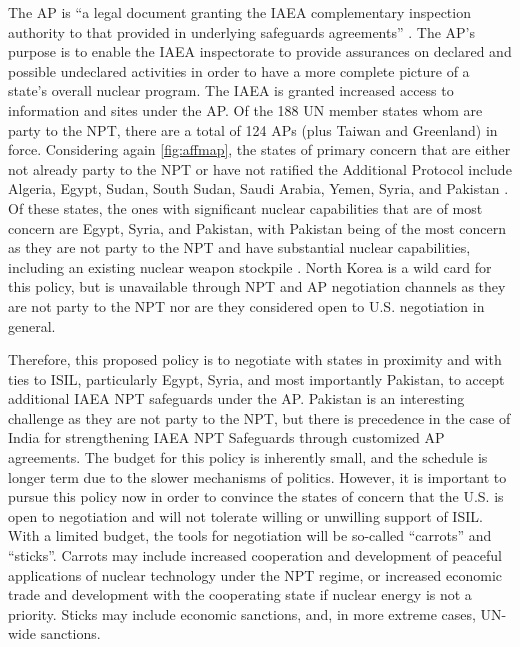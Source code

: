 \documentclass{report}
\begin{document}
The AP is \enquote{a legal document granting the IAEA complementary inspection authority to that provided in underlying safeguards agreements} \cite{InternationalAtomicEnergyAgency1997}. The AP's purpose is to enable the IAEA inspectorate to provide assurances on declared and possible undeclared activities in order to have a more complete picture of a state's overall nuclear program. The IAEA is granted increased access to information and sites under the AP. Of the 188 UN member states whom are party to the NPT, there are a total of 124 APs (plus Taiwan and Greenland) in force. Considering again \autoref{fig:affmap}, the states of primary concern that are either not already party to the NPT or have not ratified the Additional Protocol include Algeria, Egypt, Sudan, South Sudan, Saudi Arabia, Yemen, Syria, and Pakistan \cite{DefenseThreatReductionAgency,InventoryofInternationalNonproliferationOrganizationsandRegimes2013}. Of these states, the ones with significant nuclear capabilities that are of most concern are Egypt, Syria, and Pakistan, with Pakistan being of the most concern as they are not party to the NPT and have substantial nuclear capabilities, including an existing nuclear weapon stockpile \cite{InventoryofInternationalNonproliferationOrganizationsandRegimes2013}. North Korea is a wild card for this policy, but is unavailable through NPT and AP negotiation channels as they are not party to the NPT nor are they considered open to U.S. negotiation in general. 

Therefore, this proposed policy is to negotiate with states in proximity and with ties to ISIL, particularly Egypt, Syria, and most importantly Pakistan, to accept additional IAEA NPT safeguards under the AP. Pakistan is an interesting challenge as they are not party to the NPT, but there is precedence in the case of India for strengthening IAEA NPT Safeguards through customized AP agreements. The budget for this policy is inherently small, and the schedule is longer term due to the slower mechanisms of politics.  However, it is important to pursue this policy now in order to convince the states of concern that the U.S. is open to negotiation and will not tolerate willing or unwilling support of ISIL. With a limited budget, the tools for negotiation will be so-called \enquote{carrots} and \enquote{sticks}. Carrots may include increased cooperation and development of peaceful applications of nuclear technology under the NPT regime, or increased economic trade and development with the cooperating state if nuclear energy is not a priority. Sticks may include economic sanctions, and, in more extreme cases, UN-wide sanctions.
\end{document}
